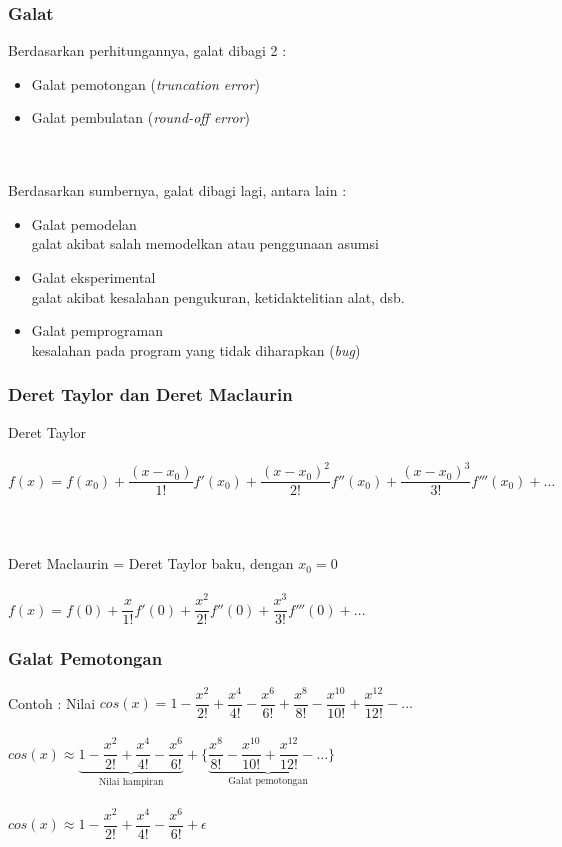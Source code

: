 \documentclass{beamer}
\begin{document}
\begin{frame}
\frametitle{Galat}
Berdasarkan perhitungannya, galat dibagi 2 :
\begin{itemize}
\item Galat pemotongan (\textit{truncation error})
\item Galat pembulatan (\textit{round-off error})
\end{itemize}
\ \\\ \\
Berdasarkan sumbernya, galat dibagi lagi, antara lain :
\begin{itemize}
\item Galat pemodelan
\\galat akibat salah memodelkan atau penggunaan asumsi
\item Galat eksperimental 
\\galat akibat kesalahan pengukuran, ketidaktelitian alat, dsb.
\item Galat pemprograman 
\\kesalahan pada program yang tidak diharapkan (\textit{bug})
\end{itemize}
\end{frame}

\begin{frame}
\frametitle{Deret Taylor dan Deret Maclaurin}
Deret Taylor\\\ \\
$f(x) = f(x_0)+ \dfrac{(x-x_0)}{1!}f'(x_0) + \dfrac{(x-x_0)^2}{2!}f''(x_0) + \dfrac{(x-x_0)^3}{3!}f'''(x_0) + \dots $
\\\ \\\ \\\ \\Deret Maclaurin = Deret Taylor baku, dengan $x_0=0$\\\ \\
$f(x) = f(0)+ \dfrac{x}{1!}f'(0) + \dfrac{x^2}{2!}f''(0) + \dfrac{x^3}{3!}f'''(0) + \dots $

\end{frame}

\begin{frame}
\frametitle{Galat Pemotongan}
Contoh : Nilai $cos(x)=1-\dfrac{x^2}{2!}+\dfrac{x^4}{4!}-\dfrac{x^6}{6!}+\dfrac{x^8}{8!}-\dfrac{x^{10}}{10!}+\dfrac{x^{12}}{12!}-\dots$
\\\ \\$cos(x)\approx \underbrace{1-\dfrac{x^2}{2!}+\dfrac{x^4}{4!}-\dfrac{x^6}{6!}}_{\text{Nilai hampiran}}+ \Biggl\{\underbrace{\dfrac{x^8}{8!}-\dfrac{x^{10}}{10!}+\dfrac{x^{12}}{12!}-\dots }_{\text{Galat pemotongan}}\Biggr\}$
\\\ \\$cos(x)\approx {1-\dfrac{x^2}{2!}+\dfrac{x^4}{4!}-\dfrac{x^6}{6!}} + \epsilon$ 
\end{frame}
\end{document}
